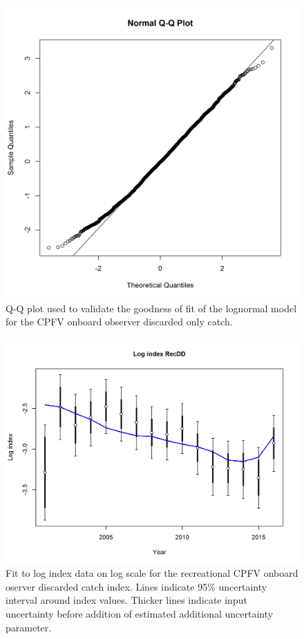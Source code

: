 \documentclass[12pt,]{article}
\begin{document}
\FloatBarrier

\begin{figure}[htbp]
\centering
\includegraphics{Figures/Fleet6_RecDD_QQ.png}
\caption{Q-Q plot used to validate the goodness of fit of the lognormal
model for the CPFV onboard observer discarded only catch.
\label{fig:Fleet6_RecDD_QQ}}
\end{figure}

\begin{figure}[htbp]
\centering
\includegraphics{r4ss/plots_mod1/index5_logcpuefit_RecDD.png}
\caption{Fit to log index data on log scale for the recreational CPFV
onboard oserver discarded catch index. Lines indicate 95\% uncertainty
interval around index values. Thicker lines indicate input uncertainty
before addition of estimated additional uncertainty parameter.
\label{fig:Fleet6_index5_logcpuefit_RecDD}}
\end{figure}
\end{document}
